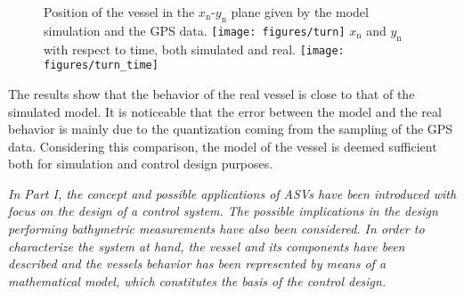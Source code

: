\begin{figure}[H]
    \captionbox 
    {   
        Position of the vessel in the $x_\mathrm{n}$-$y_\mathrm{n}$ plane given by the model simulation and the GPS data.
        \label{fig:turn}
    }                                                                 
    {                                                                  
        \texttt{[image: figures/turn]}         
    }                                                                    
    \hspace{5pt}                                                          
    \captionbox  
    {      
        $x_\mathrm{n}$ and $y_\mathrm{n}$ with respect to time, both simulated and real.
        \label{fig:turn_time}
    }                                                                        
    {
        \texttt{[image: figures/turn\_time]}
    }
\end{figure}

The results show that the behavior of the real vessel is close to that of the simulated model. It is noticeable that the error between the model and the real behavior is mainly due to the quantization coming from the sampling of the GPS data. Considering this comparison, the model of the vessel is deemed sufficient both for simulation and control design purposes. 

{\vspace*{\fill}
\textit{In Part I, the concept and possible applications of ASVs have been introduced with focus on the design of a control system. The possible implications in the design  performing bathymetric measurements have also been considered. In order to characterize the system at hand, the vessel and its components have been described and the vessels behavior has been represented by means of a mathematical model, which constitutes the basis of the control design.}}


